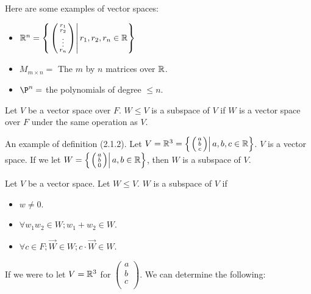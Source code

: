   Here are some examples of vector spaces:

  \begin{itemize}
    \item $\mathbb{R}^n=\left\{\left.\left(\begin{smallmatrix}r_1\\r_2\\\vdots\\r_n\end{smallmatrix}\right)\right|r_1,r_2,r_n\in\mathbb{R}\right\}$
    \item $M_{m\times n}=$ The $m$ by $n$ matrices over $\mathbb{R}$.
    \item $\P^n=$ the polynomials of degree $\le n$.
  \end{itemize}

  \begin{definition}
    Let $V$ be a vector space over $F$. $W\le V$ is a subspace of $V$ if $W$ is a vector space over $F$ under the same operation as $V$.
  \end{definition}

  An example of definition (2.1.2). Let $V=\mathbb{R}^3=\left\{\left.\left(\begin{smallmatrix}a\\b\\c\end{smallmatrix}\right)\right|a,b,c\in\mathbb{R}\right\}$. $V$ is a vector space. If we let $W=\left\{\left.\left(\begin{smallmatrix}a\\b\\0\\\end{smallmatrix}\right)\right|a,b\in\mathbb{R}\right\}$, then $W$ is a subspace of $V$.

  \begin{theorem}
    Let $V$ be a vector space. Let $W\le V$. $W$ is a subspace of $V$ if 
    \begin{itemize}
      \item $w\neq0$.
      \item $\forall w_1w_2\in W;w_1+w_2\in W$.
      \item $\forall c\in F;\vec{W}\in W;c\cdot\vec{W}\in W$.
    \end{itemize}
  \end{theorem}

  If we were to let $V=\mathbb{R}^3$ for $\left(\begin{smallmatrix}a\\b\\c\\\end{smallmatrix}\right)$. We can determine the following:

